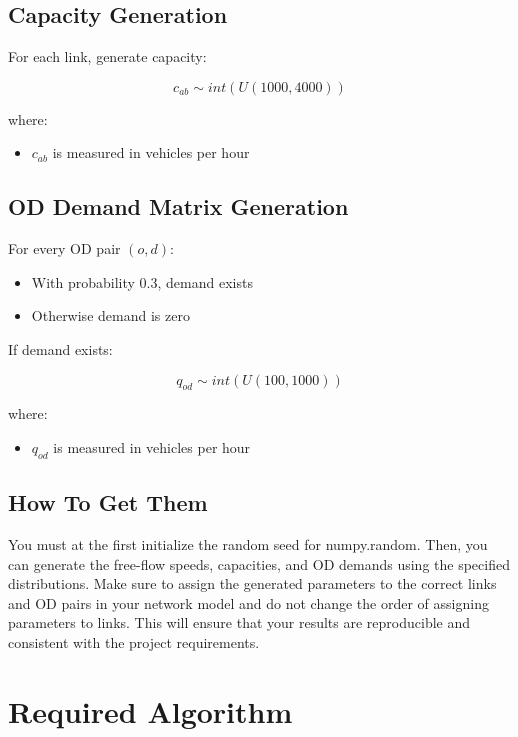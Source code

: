 \documentclass{rapportCS} %
\begin{document}
\subsection{Capacity Generation}

For each link, generate capacity:

\[
c_{ab} \sim int(U(1000,4000))
\]

where:
\begin{itemize}
    \item \(c_{ab}\) is measured in vehicles per hour
\end{itemize}

\subsection{OD Demand Matrix Generation}

For every OD pair \((o,d)\):

\begin{itemize}
    \item With probability \(0.3\), demand exists
    \item Otherwise demand is zero
\end{itemize}

If demand exists:

\[
q_{od} \sim int(U(100,1000))
\]

where:
\begin{itemize}
    \item \(q_{od}\) is measured in vehicles per hour
\end{itemize}

\subsection{How To Get Them}
You must at the first initialize the random seed for numpy.random. Then, you can generate the free-flow speeds, capacities, and OD demands using the specified distributions. Make sure to assign the generated parameters to the correct links and OD pairs in your network model and do not change the order of assigning parameters to links. This will ensure that your results are reproducible and consistent with the project requirements.

\section{Required Algorithm}
\end{document}
